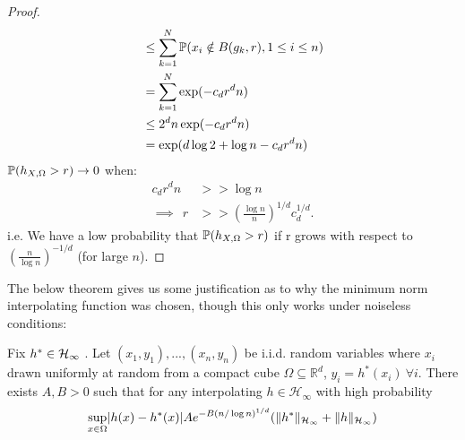 \documentclass[twoside]{memoir}
\begin{document}
\begin{proof}
\begin{equation*}
\begin{split}
		&\leq \sum_{k=1}^{N}\mathbb{P}(x_i \notin B(g_k, r), 1 \leq i \leq n) \\
		&= \sum_{k=1}^{N} \exp(-c_d r^d n)\\
		&\leq 2^d n \exp(-c_d r^d n)\\
		&= \exp(d\log 2+\log n - c_d r^d n )
 	\end{split}
	\end{equation*}
	$\mathbb{P}(h_{X,\Omega} > r) \rightarrow 0$ when:
	\begin{equation*}
	\begin{split}
		c_dr^dn &>> \log n\\
		\implies ~~ r &>> (\frac{\log n}{n})^{1/d} c_d^{1/d}.
	\end{split}
	\end{equation*}
	i.e. We have a low probability that $\mathbb{P}(h_{X,\Omega} > r)$ if r grows with respect to $(\frac{n}{\log n})^{-1/d}$ (for large $n$).  
\end{proof}


The below theorem gives us some justification as to why the minimum norm interpolating function was chosen, though this only works under noiseless conditions:
\begin{thm} \label{thm:approx}
	Fix $h^* \in \mathcal{H}_\infty $  .
	Let $(x_1,y_1), ..., (x_n,y_n)$ be i.i.d. random variables where $x_i$ drawn uniformly at random from a compact cube $\Omega \subseteq \mathbb{R}^d $,
	$y_i = h^*(x_i) \: \forall i$. There exists $A, B > 0$ such that for any interpolating $h \in \mathcal{H}_\infty $ with high probability
	\begin{equation*}
	\sup_{x \in \Omega} \lvert h(x) - h^*(x)\rvert A e^{-B(n/ \log n)^{1/d}} (\lVert h^*\rVert_{\mathcal{H}_\infty} + \lVert h\rVert_{\mathcal{H}_\infty})
	\end{equation*}
\end{thm}
\end{document}
